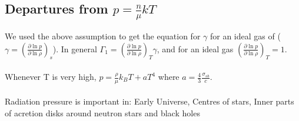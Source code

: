\documentclass{article}
\begin{document}
{\subsection{Departures from $p=\frac{n}{\mu}kT$}
We used the above assumption to get the equation for $\gamma$ for an ideal gas of ($\gamma = (\frac{\partial \ln p}{\partial \ln \rho})_s $). In general $\Gamma_1 = (\frac{\partial \ln p}{\partial \ln \rho})_T \gamma$, and for an ideal gas $(\frac{\partial \ln p}{\partial \ln \rho})_T =1$.\\\\
Whenever T is very high, $p = \frac{\rho}{\mu} k_B T + a T^4$ where $a = \frac{4}{3} \frac{\sigma_{sb}}{c}$.\\\\
Radiation pressure is important in: Early Universe, Centres of stars, Inner parts of acretion disks around neutron stars and black holes\\\\
}
\end{document}
